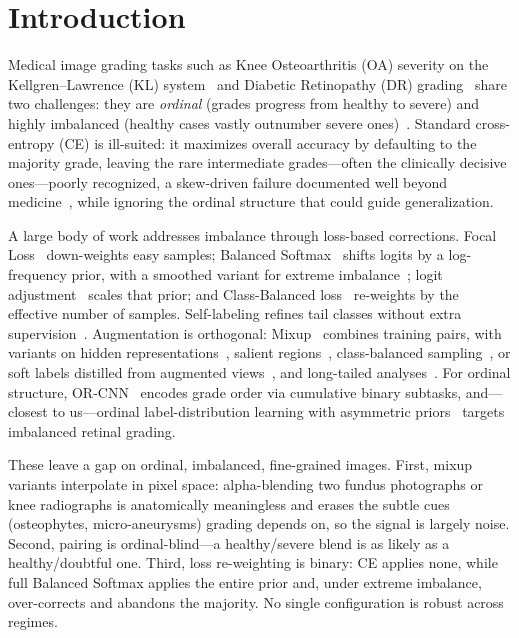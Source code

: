 \documentclass[runningheads]{svproc}
\begin{document}
\section{Introduction}

Medical image grading tasks such as Knee Osteoarthritis (OA) severity on the Kellgren--Lawrence (KL) system~\cite{kellgren1957radiological} and Diabetic Retinopathy (DR) grading~\cite{gulshan2016development} share two challenges: they are \textit{ordinal} (grades progress from healthy to severe) and highly imbalanced (healthy cases vastly outnumber severe ones)~\cite{buda2018systematic}. Standard cross-entropy (CE) is ill-suited: it maximizes overall accuracy by defaulting to the majority grade, leaving the rare intermediate grades---often the clinically decisive ones---poorly recognized, a skew-driven failure documented well beyond medicine~\cite{phung2026xai}, while ignoring the ordinal structure that could guide generalization.

A large body of work addresses imbalance through loss-based corrections. Focal Loss~\cite{lin2017focal} down-weights easy samples; Balanced Softmax~\cite{ren2020balanced} shifts logits by a log-frequency prior, with a smoothed variant for extreme imbalance~\cite{vu2024smooth}; logit adjustment~\cite{menon2021logit} scales that prior; and Class-Balanced loss~\cite{cui2019classbalanced} re-weights by the effective number of samples. Self-labeling refines tail classes without extra supervision~\cite{vu2024lcsl}. Augmentation is orthogonal: Mixup~\cite{zhang2018mixup} combines training pairs, with variants on hidden representations~\cite{verma2019manifold}, salient regions~\cite{yun2019cutmix}, class-balanced sampling~\cite{galdran2021balanced}, or soft labels distilled from augmented views~\cite{thuong2025skdnet}, and long-tailed analyses~\cite{vu2024augmentation}. For ordinal structure, OR-CNN~\cite{niu2016coral} encodes grade order via cumulative binary subtasks, and---closest to us---ordinal label-distribution learning with asymmetric priors~\cite{shaik2025ordinal} targets imbalanced retinal grading.

These leave a gap on ordinal, imbalanced, fine-grained images. First, mixup variants interpolate in pixel space: alpha-blending two fundus photographs or knee radiographs is anatomically meaningless and erases the subtle cues (osteophytes, micro-aneurysms) grading depends on, so the signal is largely noise. Second, pairing is ordinal-blind---a healthy/severe blend is as likely as a healthy/doubtful one. Third, loss re-weighting is binary: CE applies none, while full Balanced Softmax applies the entire prior and, under extreme imbalance, over-corrects and abandons the majority. No single configuration is robust across regimes.
\end{document}
